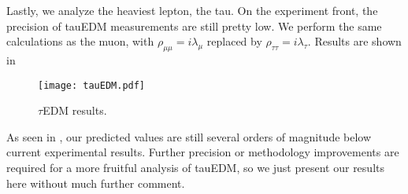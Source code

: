 Lastly, we analyze the heaviest lepton, the tau. 
On the experiment front, the precision of tauEDM measurements are still pretty low.
We perform the same calculations as the muon, with \(\rho_{\mu\mu} = i\lambda_{\mu} \) replaced by \(\rho_{\tau\tau} = i\lambda_{\tau} \).
Results are shown in 

\begin{figure}[t]
    \centering
    \texttt{[image: tauEDM.pdf]}
    \caption{\(\tau \)EDM results.}
    \label{fig:tauEDM}
\end{figure}

As seen in , our predicted values are still several orders of magnitude below current experimental results.
Further precision or methodology improvements are required for a more fruitful analysis of tauEDM, so we just present our results here without much further comment.
